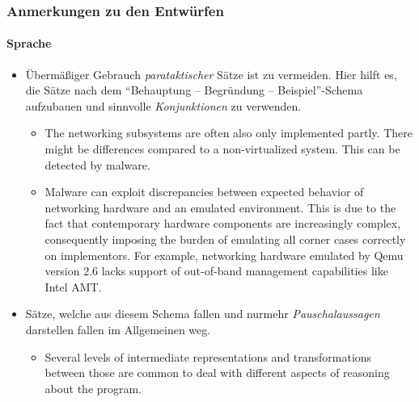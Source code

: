 \documentclass{i20lecture}
\begin{document}
\begin{frame}
  \frametitle{Anmerkungen zu den Entwürfen}
  \framesubtitle{Sprache}

  \begin{itemize}
    \item Übermäßiger Gebrauch \emph{parataktischer} Sätze ist zu vermeiden. Hier hilft es,
    die Sätze nach dem ``Behauptung -- Begründung -- Beispiel''-Schema aufzubauen und
    sinnvolle \emph{Konjunktionen} zu verwenden.
    \begin{itemize}
      \item The networking subsystems are often also only implemented partly.
      There might be differences compared to a non-virtualized system. This can
      be detected by malware.
      \item Malware can exploit discrepancies between expected behavior of
      networking hardware and an emulated environment. This is due to the fact
      that contemporary hardware components are increasingly complex,
      consequently imposing the burden of emulating all corner cases correctly
      on implementors. For example, networking hardware emulated by Qemu version
      2.6 lacks support of out-of-band management capabilities like Intel AMT.
    \end{itemize}
    \item Sätze, welche aus diesem Schema fallen und nurmehr \emph{Pauschalaussagen} darstellen
    fallen im Allgemeinen weg.
    \begin{itemize}
      \item Several levels of intermediate representations and transformations
      between those are common to deal with different aspects of reasoning about
      the program.
    \end{itemize}
  \end{itemize}
\end{frame}
\end{document}
